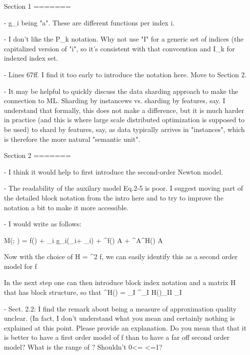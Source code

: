 Section 1
=======

- g_i being "a". These are different functions per index i.

- I don't like the \mathcal P_k notation.  Why not use "I" for a generic set of indices (the capitalized version of "i", so  it's consistent with that convcention and I_k for indexed index set.

- Lines 67ff. I find it too early to introduce the notation here. Move to Section 2.

- It may be helpful to quickly discuss the data sharding approach to make the connection to ML. Sharding by instancews vs. sharding by features, say. I understand that formally, this does not make a difference, but it is much harder in practice (and this is where large scale distributed optimization is supposed to be used) to shard by features, say, as data typically arrives in "instances", which is therefore the more natural "semantic unit". 


Section 2
=======

- I think it would help to first introduce the second-order Newton model.

- The readability of the auxilary model Eq.2-5 is poor. I suggest moving part of the detailed block notation from the intro here and to try to improve the notation a bit to make it more accessible.

- I would write as follows: 

	\mathcal M(\triangle \alpha; \alpha) 
	= 
	\mathcal f(\alpha) + \sum_i g_i(\alpha_i+ \triangle \alpha_i)   	%
	+ \nabla^\top f(\alpha) A \triangle \alpha 					%
	+ \frac {} 
		\triangle \alpha^\top A^\top H(\alpha) A \triangle \alpha	%
													
	Now with the choice of H = \nbabla^2 f, we can easily identify this as a second order model for f
														
	In the next step one can then introduce block index notation and a matrix \tilde H that has block structure, so that 
	\triangle \alpha^\top \tilde H(\alpha) \triangle \alpha = \sum_I \triangle \alpha^\top_I \tilde H(\alpha)_{II} \triangle \alpha_I
	
- Sect. 2.2: I find the remark about \sigma being a measure of approximation quality unclear. (In fact, I don't understand what you mean and certainly nothing is explained at this point. Please provide an explanation. Do you mean that that it is better to have a first order model of f than to have a far off second order model? What is the range of \sigma? Shouldn't 0<= \sigma <=1?

